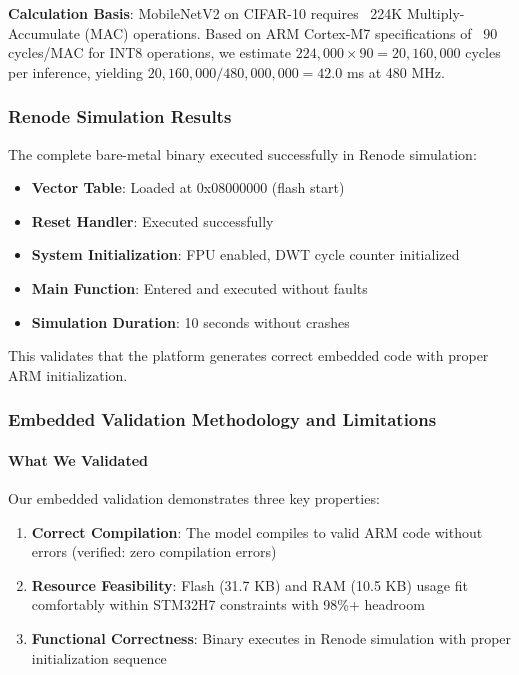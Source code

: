 \textbf{Calculation Basis}: MobileNetV2 on CIFAR-10 requires ~224K
Multiply-Accumulate (MAC) operations. Based on ARM Cortex-M7
specifications of ~90 cycles/MAC for INT8 operations, we estimate
$224{,}000 \times 90 = 20{,}160{,}000$ cycles per inference, yielding
$20{,}160{,}000 / 480{,}000{,}000 = 42.0$ ms at 480 MHz.

\subsubsection{Renode Simulation Results}

The complete bare-metal binary executed successfully in Renode simulation:

\begin{itemize}
\item \textbf{Vector Table}: Loaded at 0x08000000 (flash start)
\item \textbf{Reset Handler}: Executed successfully
\item \textbf{System Initialization}: FPU enabled, DWT cycle counter initialized
\item \textbf{Main Function}: Entered and executed without faults
\item \textbf{Simulation Duration}: 10 seconds without crashes
\end{itemize}

This validates that the platform generates correct embedded code with
proper ARM initialization.


\subsubsection{Embedded Validation Methodology and Limitations}

\paragraph{What We Validated}

Our embedded validation demonstrates three key properties:

\begin{enumerate}
\item \textbf{Correct Compilation}: The model compiles to valid ARM code
without errors (verified: zero compilation errors)

\item \textbf{Resource Feasibility}: Flash (31.7 KB) and RAM (10.5 KB)
usage fit comfortably within STM32H7 constraints with 98\%+ headroom

\item \textbf{Functional Correctness}: Binary executes in Renode simulation
with proper initialization sequence
\end{enumerate}

